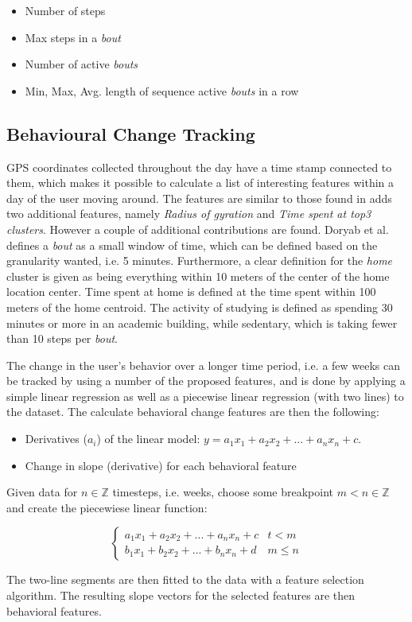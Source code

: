 \begin{itemize}
    \item Number of steps
    \item Max steps in a \textit{bout}
    \item Number of active \textit{bouts}
    \item Min, Max, Avg. length of sequence active \textit{bouts} in a row
\end{itemize}
    
\subsection{Behavioural Change Tracking}

GPS coordinates collected throughout the day have a time stamp connected to them, which makes it possible to calculate a list of interesting features within a day of the user moving around. The features are similar to those found in \cite{Saeb2015} adds two additional features, namely \textit{Radius of gyration} and \textit{Time spent at top3 clusters}. However a couple of additional contributions are found. Doryab et al. defines a \textit{bout} as a small window of time, which can be defined based on the granularity wanted, i.e. 5 minutes. Furthermore, a clear definition for the \textit{home} cluster is given as being everything within 10 meters of the center of the home location center. Time spent at home is defined at the time spent within 100 meters of the home centroid. The activity of studying is defined as spending 30 minutes or more in an academic building, while sedentary, which is taking fewer than 10 steps per \textit{bout}.




The change in the user's behavior over a longer time period, i.e. a few weeks can be tracked by using a number of the proposed features, and is done by applying a simple linear regression as well as a piecewise linear regression (with two lines) to the dataset. The calculate behavioral change features are then the following:

\begin{itemize}
    \item Derivatives ($a_i$) of the linear model: $y=a_1 x_1 + a_2 x_2 + ... + a_n x_n + c$.
    \item Change in slope (derivative) for each behavioral feature
\end{itemize}

Given data for $n \in \mathbb{Z}$ timesteps, i.e. weeks, choose some breakpoint $m < n \in \mathbb{Z}$ and create the piecewiese linear function:

\[ \begin{cases} 
      a_1 x_1 + a_2 x_2 + ... + a_n x_n + c & t <    m \\
      b_1 x_1 + b_2 x_2 + ... + b_n x_n + d & m \leq n 
   \end{cases}
\]

The two-line segments are then fitted to the data with a feature selection algorithm. The resulting slope vectors for the selected features are then behavioral features.



